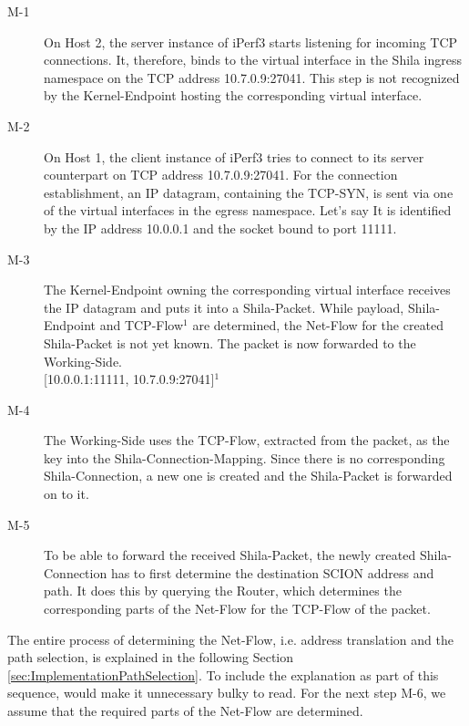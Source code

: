 \begin{description}
	\item[M-1] On Host 2, the server instance of iPerf3 starts listening for incoming TCP connections. It, therefore, binds to the virtual interface in the Shila ingress namespace on the TCP address 10.7.0.9:27041. This step is not recognized by the Kernel-Endpoint hosting the corresponding virtual interface.
	\item[M-2] On Host 1, the client instance of iPerf3 tries to connect to its server counterpart on TCP address 10.7.0.9:27041. For the connection establishment, an IP datagram, containing the TCP-SYN, is sent via one of the virtual interfaces in the egress namespace. Let's say It is identified by the IP address 10.0.0.1 and the socket bound to port 11111.
	\item[M-3] The Kernel-Endpoint owning the corresponding virtual interface receives the IP datagram and puts it into a Shila-Packet. While payload, Shila-Endpoint and TCP-Flow$^{1}$ are determined, the Net-Flow for the created Shila-Packet is not yet known. The packet is now forwarded to the Working-Side.\medskip\\{\small[10.0.0.1:11111, 10.7.0.9:27041]$^{1}$}
	\item[M-4] The Working-Side uses the TCP-Flow, extracted from the packet, as the key into the Shila-Connection-Mapping. Since there is no corresponding Shila-Connection, a new one is created and the Shila-Packet is forwarded on to it.  
	\item[M-5] To be able to forward the received Shila-Packet, the newly created Shila-Connection has to first determine the destination SCION address and path. It does this by querying the Router, which determines the corresponding parts of the Net-Flow for the TCP-Flow of the packet.
\end{description}

The entire process of determining the Net-Flow, i.e. address translation and the path selection, is explained in the following Section \ref{sec:ImplementationPathSelection}. To include the explanation as part of this sequence, would make it unnecessary bulky to read. For the next step M-6, we assume that the required parts of the Net-Flow are determined.

